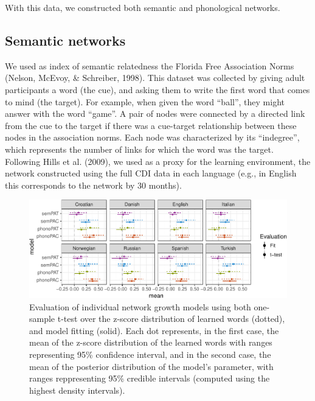 \documentclass[10pt, letterpaper]{article}
\newenvironment{CodeChunk}{}{}
\begin{document}
With this data, we constructed both semantic and phonological networks.

\subsection{Semantic networks}\label{semantic-networks}

We used as index of semantic relatedness the Florida Free Association
Norms (Nelson, McEvoy, \& Schreiber, 1998). This dataset was collected
by giving adult participants a word (the cue), and asking them to write
the first word that comes to mind (the target). For example, when given
the word ``ball'', they might answer with the word ``game''. A pair of
nodes were connected by a directed link from the cue to the target if
there was a cue-target relationship between these nodes in the
association norms. Each node was characterized by its ``indegree'',
which represents the number of links for which the word was the target.
Following Hills et al. (2009), we used as a proxy for the learning
environment, the network constructed using the full CDI data in each
language (e.g., in English this corresponds to the network by 30
months).

\begin{CodeChunk}
\begin{figure}[h]

{\centering \includegraphics{figs/pred_ind_img-1} 

}

\caption{\label{fig:pred_ind}Evaluation of individual network growth models using both  one-sample t-test over the z-score distribution of learned words (dotted), and model fitting (solid). Each dot represents, in the first case, the mean of the z-score distribution of the learned words with ranges representing 95\% confidence interval, and in the second case, the mean of the posterior distribution of the model's parameter, with ranges reppresenting 95\% credible intervals (computed using the highest density intervals).}\label{fig:pred_ind_img}
\end{figure}
\end{CodeChunk}
\end{document}
